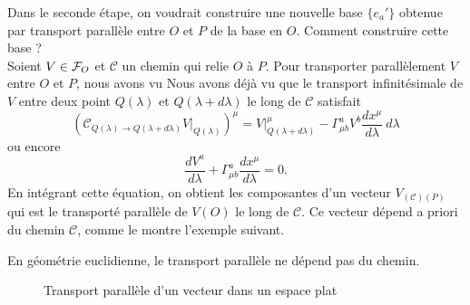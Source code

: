 \documentclass[a4paper,11pt]{report}
\begin{document}
                Dans le seconde étape, on voudrait construire une nouvelle base $\{e_a'\}$ obtenue par transport parallèle entre $O$ et $P$ de la base en $O$. Comment construire cette base ?\\
                Soient $V\in\mathcal{F}_O$ et $\mathscr{C}$ un chemin qui relie $O$ à $P$. Pour transporter parallèlement $V$ entre $O$ et $P$, nous avons vu Nous avons déjà vu que le transport infinitésimale de $V$ entre deux point $Q(\lambda)$ et $Q(\lambda+d\lambda)$ le long de $\mathscr{C}$ satisfait
                \begin{equation}
                    \left(\mathscr{C}_{Q(\lambda)\to Q(\lambda+d\lambda)}V|_{Q(\lambda)}\right)^\mu = V|_{Q(\lambda+d\lambda)}^\mu-\Gamma^a_{\mu b}V^b \frac{dx^\mu}{d\lambda} ~d\lambda
                \end{equation}
                ou encore 
                \begin{equation}\label{eq:transportv}
                    \frac{dV^a}{d\lambda} + \Gamma^a_{\mu b}\frac{dx^\mu}{d\lambda} = 0.
                \end{equation}
                En intégrant cette équation, on obtient les composantes d'un vecteur $V_{(\mathscr{C})(P)}$ qui est le transporté parallèle de $V(O)$ le long de $\mathscr{C}$. Ce vecteur dépend a priori du chemin $\mathscr{C}$, comme le montre l'exemple suivant.
                
                \begin{exmp}
                    En géométrie euclidienne, le transport parallèle ne dépend pas du chemin.
                    \begin{figure}[H]
                        \centering
                        \caption{Transport parallèle d'un vecteur dans un espace plat}
                    \end{figure}
                \end{exmp}
                
\end{document}
